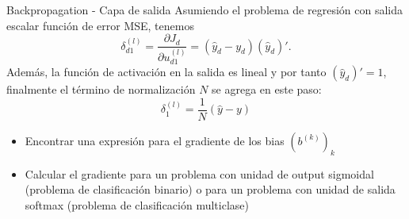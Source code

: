 \documentclass[handout, 9pt]{beamer}
\begin{document}
\begin{frame}{Backpropagation - Capa de salida}
Asumiendo el problema de regresión con salida escalar función de error MSE, tenemos \pause
\[
\delta_{d1}^{(l)} = \frac{\partial J_d}{\partial u_{d1}^{(l)}} = (\hat{y}_d-y_d) (\hat{y}_d)'.
\] \pause
Además, la función de activación en la salida es lineal y por tanto $(\hat{y}_d)' = 1$, finalmente el término de normalización $N$ se agrega en este paso: \pause
\[
\delta_{1}^{(l)} = \frac{1}{N}(\hat{y}-y)
\]
\pause
\begin{propuesto}
\begin{itemize}
  \item Encontrar una expresión para el gradiente de los bias $(b^{(k)})_k$
  \item Calcular el gradiente para un problema con unidad de output sigmoidal (problema de clasificación binario) o para un problema con unidad de salida softmax (problema de clasificación multiclase) 
\end{itemize}
\end{propuesto}


\end{frame}
\end{document}
